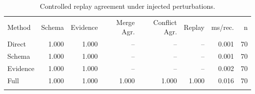\begin{table}[t]
\caption{Controlled replay agreement under injected perturbations.}
\label{tab:ablation}
\begin{tabular*}{\hsize}{@{\extracolsep{\fill}}lrrrrrrr@{}}
\toprule
Method & Schema & Evidence & Merge Agr. & Conflict Agr. & Replay & ms/rec. & n\\
\colrule
Direct & 1.000 & 1.000 & -- & -- & -- & 0.001 & 70\\
Schema & 1.000 & 1.000 & -- & -- & -- & 0.001 & 70\\
Evidence & 1.000 & 1.000 & -- & -- & -- & 0.002 & 70\\
Full & 1.000 & 1.000 & 1.000 & 1.000 & 1.000 & 0.016 & 70\\
\botrule
\end{tabular*}
\end{table}

